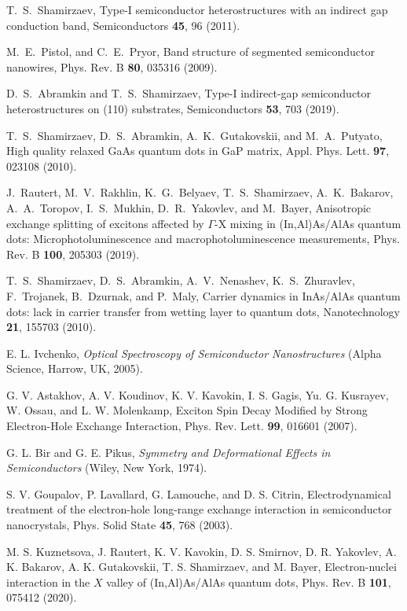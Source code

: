 \documentclass[twocolumn,showpacs,preprintnumbers,amsmath,amssymb,aps]{revtex4-1}
\begin{document}
\begin{thebibliography}{}
 T.~S.~Shamirzaev, Type-I semiconductor heterostructures with an indirect gap conduction band,  Semiconductors \textbf{45}, 96 (2011).

  M.~E.~Pistol, and C.~E.~Pryor, Band structure of segmented semiconductor nanowires, Phys. Rev. B \textbf{80}, 035316 (2009).

 D.~S.~Abramkin and T.~S.~Shamirzaev, Type-I indirect-gap semiconductor heterostructures on (110) substrates, Semiconductors \textbf{53}, 703 (2019).


 T.~S.~Shamirzaev, D.~S.~Abramkin, A.~K.~Gutakovskii, and M.~A.~Putyato, High quality relaxed GaAs quantum dots in GaP matrix, Appl. Phys. Lett. \textbf{97}, 023108 (2010).


 J.~Rautert, M.~V.~Rakhlin, K.~G.~Belyaev, T.~S.~Shamirzaev, A.~K.~Bakarov, A.~A.~Toropov, I.~S.~Mukhin, D.~R.~Yakovlev, and M.~Bayer, Anisotropic exchange splitting of excitons affected by $\Gamma$-X mixing in (In,Al)As/AlAs quantum dots:
Microphotoluminescence and macrophotoluminescence measurements,
Phys. Rev. B \textbf{100}, 205303 (2019).

 T.~S.~Shamirzaev, D.~S.~Abramkin, A.~V.~Nenashev, K.~S.~Zhuravlev, F.~Trojanek, B.~Dzurnak, and P.~Maly, Carrier dynamics in InAs/AlAs quantum dots: lack in carrier transfer from wetting layer to quantum dots, Nanotechnology  \textbf{21}, 155703 (2010).

 E. L. Ivchenko, \textit{Optical Spectroscopy of Semiconductor Nanostructures} (Alpha Science, Harrow, UK, 2005).

 G. V. Astakhov, A. V. Koudinov, K. V. Kavokin, I. S. Gagis, Yu. G. Kusrayev, W. Ossau, and L. W. Molenkamp, Exciton Spin Decay Modified by Strong Electron-Hole Exchange Interaction, Phys. Rev. Lett. \textbf{99}, 016601 (2007).

 G. L. Bir and G. E. Pikus, \textit{Symmetry and Deformational
Effects in Semiconductors} (Wiley, New York, 1974).

 S. V. Goupalov, P. Lavallard, G. Lamouche, and D. S. Citrin, Electrodynamical treatment of the electron-hole long-range exchange interaction in semiconductor nanocrystals, Phys. Solid State \textbf{45}, 768 (2003).

 M. S. Kuznetsova, J. Rautert, K. V. Kavokin, D. S. Smirnov, D. R. Yakovlev, A. K. Bakarov, A. K. Gutakovskii, T. S. Shamirzaev, and M. Bayer, Electron-nuclei interaction in the $X$ valley of (In,Al)As/AlAs quantum dots, Phys. Rev. B \textbf{101}, 075412 (2020).


\end{thebibliography}
\end{document}
